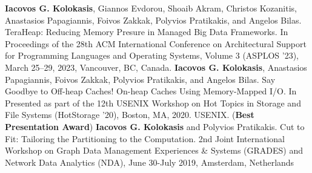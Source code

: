 



\begin{cventries}
  \cventry
    {}
    {}
    {}
    {}
	{\textbf{Iacovos G. Kolokasis}, Giannos Evdorou, Shoaib Akram,
	Christos Kozanitis, Anastasios Papagiannis, Foivos Zakkak, 
	Polyvios Pratikakis, and Angelos Bilas. TeraHeap: Reducing Memory
  Presure in Managed Big Data Frameworks. In Proceedings of the 28th
  ACM International Conference on Architectural Support for
  Programming Languages and Operating Systems, Volume 3 (ASPLOS ’23),
  March 25–29, 2023, Vancouver, BC, Canada.}
  {}
  \cventry
    {}
    {}
    {}
    {}
    {\textbf{Iacovos G. Kolokasis}, Anastasios Papagiannis, Foivos
    Zakkak, Polyvios Pratikakis, and Angelos Bilas.%
    Say Goodbye to Off-heap Caches! On-heap Caches Using Memory-Mapped
    I/O. In Presented as part of the 12th USENIX Workshop on Hot
    Topics in Storage and File Systems (HotStorage '20), Boston, MA,
    2020. USENIX. (\textbf{Best Presentation Award})}
  {}
  \cventry
    {}
    {}
    {}
    {}
    {\textbf{Iacovos G. Kolokasis} and Polyvios
  Pratikakis. Cut to Fit: Tailoring the Partitioning to the
  Computation. 2nd Joint International Workshop on Graph Data
  Management Experiences \& Systems (GRADES) and Network Data
  Analytics (NDA), June 30-July 2019, Amsterdam, Netherlands}
  {}

\end{cventries}


